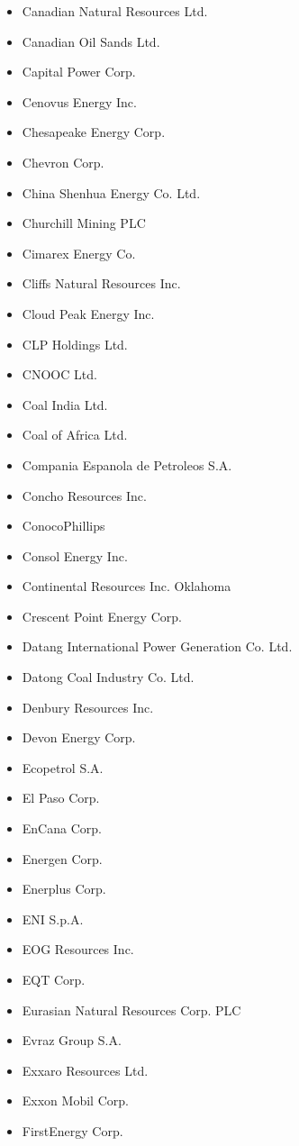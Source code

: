 \begin{itemize}
  \item Canadian Natural Resources Ltd.
  \item Canadian Oil Sands Ltd.
  \item Capital Power Corp.
  \item Cenovus Energy Inc.
  \item Chesapeake Energy Corp.
  \item Chevron Corp.
  \item China Shenhua Energy Co. Ltd.
  \item Churchill Mining PLC
  \item Cimarex Energy Co.
  \item Cliffs Natural Resources Inc.
  \item Cloud Peak Energy Inc.
  \item CLP Holdings Ltd.
  \item CNOOC Ltd.
  \item Coal India Ltd.
  \item Coal of Africa Ltd.
  \item Compania Espanola de Petroleos S.A.
  \item Concho Resources Inc.
  \item ConocoPhillips
  \item Consol Energy Inc.
  \item Continental Resources Inc. Oklahoma
  \item Crescent Point Energy Corp.
  \item Datang International Power Generation Co. Ltd.
  \item Datong Coal Industry Co. Ltd.
  \item Denbury Resources Inc.
  \item Devon Energy Corp.
  \item Ecopetrol S.A.
  \item El Paso Corp.
  \item EnCana Corp.
  \item Energen Corp.
  \item Enerplus Corp.
  \item ENI S.p.A.
  \item EOG Resources Inc.
  \item EQT Corp.
  \item Eurasian Natural Resources Corp. PLC
  \item Evraz Group S.A.
  \item Exxaro Resources Ltd.
  \item Exxon Mobil Corp.
  \item FirstEnergy Corp.

\end{itemize}
